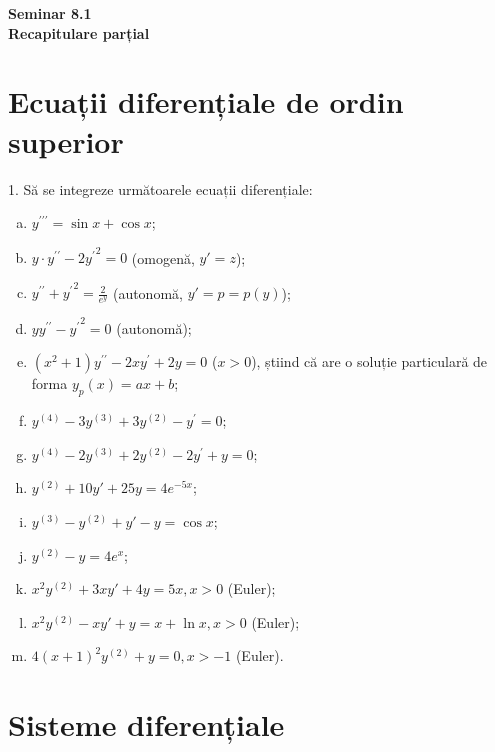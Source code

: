 \documentclass[11pt,a4paper]{article}
\theoremstyle{dotless}
\theoremstyle{dotlessdr}
\begin{document}

\begin{center}
  {\large\textbf{Seminar 8.1 \\
      Recapitulare parțial}}
\end{center}

\vspace{2cm}

\section*{Ecuații diferențiale de ordin superior}

1. Să se integreze următoarele ecuații diferențiale:
\begin{enumerate}[(a)]
\item $ y^{\prime\prime\prime} = \sin x + \cos x $;
\item $ y\cdot y^{\prime\prime} - 2{y^\prime}^2 = 0 $ (omogenă, $ y' = z $);
\item $ y^{\prime\prime} + {y^\prime}^2 = \frac{2}{e^y} $ (autonomă, $ y' = p = p(y) $);
\item $ yy^{\prime\prime} - {y^\prime}^2 = 0 $ (autonomă);
\item $ (x^2 + 1)y^{\prime\prime} - 2xy^\prime + 2y = 0 $ ($ x > 0 $), știind
  că are o soluție particulară de forma $ y_p(x) = ax + b $;
\item $ y^{(4)} - 3y^{(3)} + 3y^{(2)} - y^\prime = 0 $;
\item $ y^{(4)} - 2y^{(3)} + 2y^{(2)} - 2y^\prime + y = 0$;
\item $ y^{(2)} + 10y' + 25y = 4e^{-5x} $;
\item $ y^{(3)} - y^{(2)} + y' - y = \cos x $;
\item $ y^{(2)} - y = 4e^x $;
\item $ x^2 y^{(2)} + 3xy' + 4y = 5x, x > 0 $ (Euler);
\item $ x^2y^{(2)} - xy' + y = x + \ln x, x > 0 $ (Euler);
\item $ 4(x + 1)^2 y^{(2)} + y = 0, x > -1 $ (Euler).
\end{enumerate}


\section*{Sisteme diferențiale}
\end{document}
